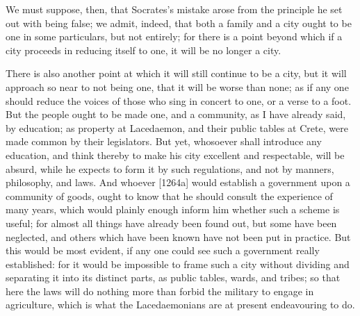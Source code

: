 We must suppose, then, that Socrates's mistake arose from the principle he
set out with being false; we admit, indeed, that both a family and a city
ought to be one in some particulars, but not entirely; for there is a
point beyond which if a city proceeds in reducing itself to one, it will
be no longer a city.

There is also another point at which it will still continue to be a city,
but it will approach so near to not being one, that it will be worse than
none; as if any one should reduce the voices of those who sing in concert
to one, or a verse to a foot. But the people ought to be made one, and a
community, as I have already said, by education; as property at
Lacedaemon, and their public tables at Crete, were made common by their
legislators. But yet, whosoever shall introduce any education, and think
thereby to make his city excellent and respectable, will be absurd, while
he expects to form it by such regulations, and not by manners, philosophy,
and laws. And whoever [1264a] would establish a government upon a
community of goods, ought to know that he should consult the experience of
many years, which would plainly enough inform him whether such a scheme is
useful; for almost all things have already been found out, but some have
been neglected, and others which have been known have not been put in
practice. But this would be most evident, if any one could see such a
government really established: for it would be impossible to frame such a
city without dividing and separating it into its distinct parts, as public
tables, wards, and tribes; so that here the laws will do nothing more than
forbid the military to engage in agriculture, which is what the
Lacedaemonians are at present endeavouring to do.

